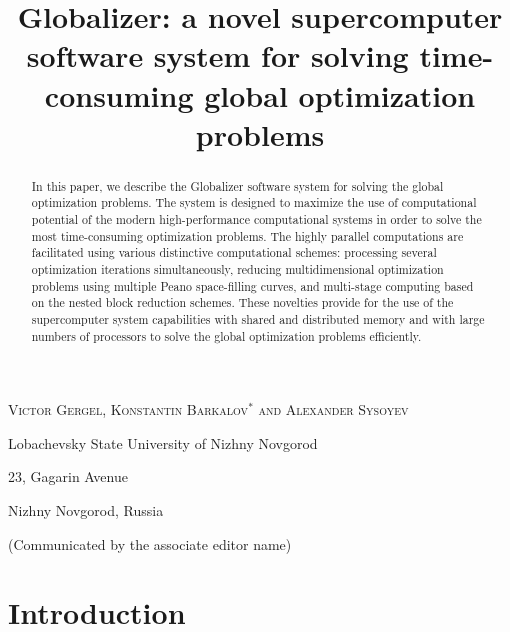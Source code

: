 \documentclass{aims}
\title[Globalizer: a supercomputer software] %
      {Globalizer: a novel supercomputer software system for solving time-consuming global optimization problems}
\author[V. P. Gergel, K. A. Barkalov and A. V. Sysoyev]{}
\theoremstyle{definition}
\begin{document}
\maketitle


\centerline{\scshape Victor Gergel, Konstantin  Barkalov$^*$ and Alexander Sysoyev}
\medskip
{\footnotesize
 \centerline{Lobachevsky State University of Nizhny Novgorod}
   \centerline{23, Gagarin Avenue}
   \centerline{Nizhny Novgorod, Russia}
}

\bigskip

 \centerline{(Communicated by the associate editor name)}


\begin{abstract}
In this paper, we describe the Globalizer software system for solving the global
optimization problems. The system is designed to maximize the use of computational
potential of the modern high-performance computational systems in order to solve the
most time-consuming optimization problems. The highly parallel computations are facilitated
using various distinctive computational schemes: processing several optimization
iterations simultaneously, reducing multidimensional optimization problems using multiple
Peano space-filling curves, and multi-stage computing based on the nested block reduction schemes.
These novelties provide for the use of the supercomputer system capabilities with shared
and distributed memory and with large numbers of processors to solve the global
optimization problems efficiently.
\end{abstract}

\section{Introduction}\label{sec:intro}
\end{document}
